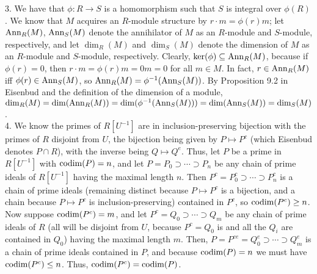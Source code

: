 \documentclass[11pt]{article}
\begin{document}
\num{3.} We have that $\phi:R\rightarrow S$ is a homomorphism such that $S$
is integral over $\phi(R)$. We know that $M$ acquires an $R$-module structure
by $r\cdot m=\phi(r)m$; let $\operatorname{Ann}_R(M)$, $\operatorname{Ann}_S(M)$ denote the annihilator
of $M$ as an $R$-module and $S$-module, respectively, and let $\dim_R(M)$
and $\dim_S(M)$ denote the dimension of $M$ as an $R$-module and $S$-module,
respectively. Clearly, $\operatorname{ker}(\phi)\subseteq\operatorname{Ann}_R(M)$, because if $\phi(r)=0$,
then $r\cdot m=\phi(r)m=0m=0$ for all $m\in M$. In fact, $r\in\operatorname{Ann}_R(M)$
iff $\phi(r)\in\operatorname{Ann}_S(M)$, so $\operatorname{Ann}_R(M)=\phi^{-1}(\operatorname{Ann}_S(M))$. By
Proposition 9.2 in Eisenbud and the definition of the dimension of a module,
$\operatorname{dim}_R(M)=\operatorname{dim}(\operatorname{Ann}_R(M))=\operatorname{dim}(\phi^{-1}(\operatorname{Ann}_S(M)))=\operatorname{dim}(\operatorname{Ann}_S(M))=\operatorname{dim}_S(M)$.
\\

\num{4.} We know the primes of $R[U^{-1}]$ are in inclusion-preserving
bijection with the primes of $R$ disjoint from $U$, the bijection being given
by $P\mapsto P^c$ (which Eisenbud denotes $P\cap R$), with the inverse being
$Q\mapsto Q^e$. Thus, let $P$ be a prime in $R[U^{-1}]$ with $\operatorname{codim}(P)=n$,
and let $P=P_0\supset\cdots\supset P_n$ be any chain of prime ideals of
$R[U^{-1}]$ having the maximal length $n$. Then $P^c=P_0^c\supset\cdots\supset
P_n^c$ is a chain of prime ideals (remaining distinct because $P\mapsto P^c$
is a bijection, and a chain because $P\mapsto P^c$ is inclusion-preserving)
contained in $P^c$, so $\operatorname{codim}(P^c)\geq n$. Now suppose $\operatorname{codim}(P^c)=m$,
and let $P^c=Q_0\supset\cdots\supset Q_m$ be any chain of prime ideals
of $R$ (all will be disjoint from $U$, because $P^c=Q_0$ is and all
the $Q_i$ are contained in $Q_0$) having the maximal length $m$. Then,
$P=P^{ce}=Q_0^e\supset\cdots\supset Q_m^e$ is a chain of prime ideals
contained in $P$, and because $\operatorname{codim}(P)=n$ we must have $\operatorname{codim}(P^c)\leq
n$. Thus, $\operatorname{codim}(P^c)=\operatorname{codim}(P)$.    \\
\end{document}
